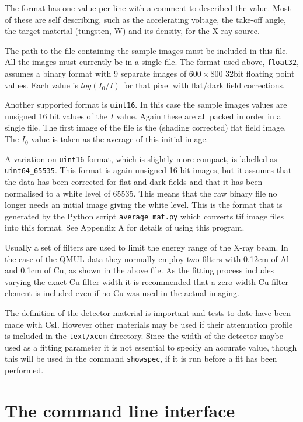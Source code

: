 \documentclass[a4paper,12pt]{article}
\begin{document}
The format has one value per line with a comment to described the value.
Most of these are self describing, such as the accelerating voltage, the take-off angle,
the target material (tungsten, W) and its density, for the X-ray source.

The path to the file containing the sample images must be included in this file.
All the images must currently be in a single file.
The format used above, \texttt{float32}, assumes a binary format with 9 separate images of $600 \times 800$ 32bit floating
point values.
Each value is $log ( I_0 / I )$ for that pixel with flat/dark field corrections.

Another supported format is \texttt{uint16}. In this case the sample images values are unsigned 16 bit values of the $I$ value.
Again these are all packed in order in a single file. The first image of the file is the (shading corrected) flat field image.
The $I_0$ value is taken as the average of this initial image.

A variation on \texttt{uint16} format, which is slightly more compact, is labelled as \texttt{uint64_65535}.
This format is again unsigned 16 bit images, but it assumes that the data has been corrected for flat and dark fields
and that it has been normalised to a white level of 65535.
This means that the raw binary file no longer needs an initial image giving the white level.
This is the format that is generated by the Python script \texttt{average_mat.py} which converts tif image files into this format.
See Appendix A for details of using this program.
 
Usually a set of filters are used to limit the energy range of the X-ray beam. In the case of the QMUL data they
normally employ two filters with 0.12cm of Al and 0.1cm of Cu, as shown in the above file.
As the fitting process includes varying the exact Cu filter width it is recommended that a zero width Cu filter element is included
even if no Cu was used in the actual imaging.

The definition of the detector material is important and tests to date have been made with CsI. However other materials may be used
if their attenuation profile is included in the \texttt{text/xcom} directory.
Since the width of the detector maybe used as a fitting parameter it is not essential to specify an accurate value, though this
will be used in the command \texttt{showspec}, if it is run before a fit has been performed.

\section{The command line interface}
\end{document}
